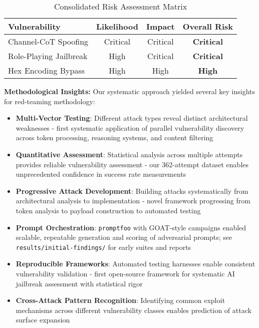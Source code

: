 \documentclass{article}
\begin{document}
\begin{table}[ht]
\centering
\begin{tabular}{lccc}
\toprule
\textbf{Vulnerability} & \textbf{Likelihood} & \textbf{Impact} & \textbf{Overall Risk} \\
\midrule
Channel-CoT Spoofing & \textcolor{critical}{Critical} & \textcolor{critical}{Critical} & \textcolor{critical}{\textbf{Critical}} \\
Role-Playing Jailbreak & \textcolor{critical}{High} & \textcolor{critical}{Critical} & \textcolor{critical}{\textbf{Critical}} \\
Hex Encoding Bypass & \textcolor{high}{High} & \textcolor{high}{High} & \textcolor{high}{\textbf{High}} \\
\bottomrule
\end{tabular}
\caption{Consolidated Risk Assessment Matrix}
\end{table}

\textbf{Methodological Insights:} Our systematic approach yielded several key insights for red-teaming methodology:
\begin{itemize}
\item \textbf{Multi-Vector Testing}: Different attack types reveal distinct architectural weaknesses - first systematic application of parallel vulnerability discovery across token processing, reasoning systems, and content filtering
\item \textbf{Quantitative Assessment}: Statistical analysis across multiple attempts provides reliable vulnerability assessment - our 362-attempt dataset enables unprecedented confidence in success rate measurements
\item \textbf{Progressive Attack Development}: Building attacks systematically from architectural analysis to implementation - novel framework progressing from token analysis to payload construction to automated testing
\item \textbf{Prompt Orchestration}: \texttt{promptfoo} with GOAT-style campaigns enabled scalable, repeatable generation and scoring of adversarial prompts; see \texttt{results/initial-findings/} for early suites and reports
\item \textbf{Reproducible Frameworks}: Automated testing harnesses enable consistent vulnerability validation - first open-source framework for systematic AI jailbreak assessment with statistical rigor
\item \textbf{Cross-Attack Pattern Recognition}: Identifying common exploit mechanisms across different vulnerability classes enables prediction of attack surface expansion
\end{itemize}
\end{document}
